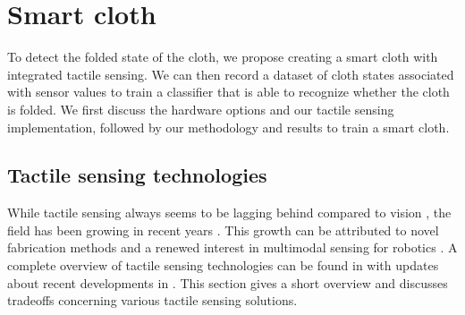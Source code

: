 \documentclass[\home/main.tex]{subfiles}
\begin{document}

\section{Smart cloth} \label{sec:instrumentation_smart_cloth}

To detect the folded state of the cloth, we propose creating a smart cloth with integrated tactile sensing. We can then record a dataset of cloth states associated with sensor values to train a classifier that is able to recognize whether the cloth is folded. We first discuss the hardware options and our tactile sensing implementation, followed by our methodology and results to train a smart cloth.



\subsection{Tactile sensing technologies}
While tactile sensing always seems to be lagging behind compared to vision \autocite{Siciliano2008}, the field has been growing in recent years \autocite{Chi2018}. This growth can be attributed to novel fabrication methods \autocite{Zou2017} and a renewed interest in multimodal sensing for robotics \autocite{digit2020}.
A complete overview of tactile sensing technologies can be found in \autocite{Siciliano2008} with updates about recent developments in \autocite{Zou2017,Chi2018}. This section gives a short overview and discusses tradeoffs concerning various tactile sensing solutions.
\end{document}
